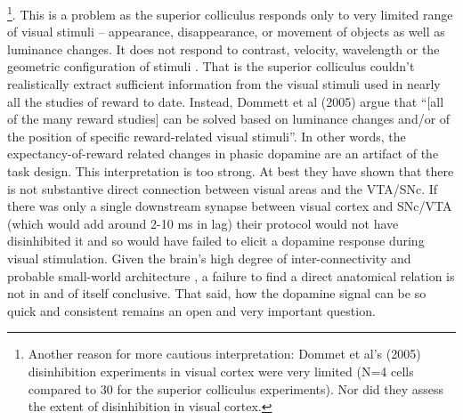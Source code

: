 \documentclass[doc,12pt]{apa}        %
\begin{document}
\footnote{
    Another reason for more cautious interpretation: Dommet et al's (2005) disinhibition experiments in visual cortex were very limited (N=4 cells compared to 30 for the superior colliculus experiments).  Nor did they assess the extent of disinhibition in visual cortex.
}. This is a problem as the superior colliculus responds only to very limited range of visual stimuli -- appearance, disappearance, or movement of objects as well as luminance changes.  It does not respond to contrast, velocity, wavelength or the geometric configuration of stimuli \cite{Dommett:2005p7263}. That is the superior colliculus couldn't realistically extract sufficient information from the visual stimuli used in nearly all the studies of reward to date.  Instead, Dommett et al (2005) argue that ``[all of the many reward studies] can be solved based on luminance changes and/or of the position of specific reward-related visual stimuli''.  In other words, the expectancy-of-reward related changes in phasic dopamine are an artifact of the task design.  This interpretation is too strong.  At best they have shown that there is not substantive direct connection between visual areas and the VTA/SNc.  If there was only a single downstream synapse between visual cortex and SNc/VTA (which would add around 2-10 ms in lag) their protocol would not have disinhibited it and so would have failed to elicit a dopamine response during visual stimulation.   Given the brain's high degree of inter-connectivity and probable small-world architecture \cite{bassett:2006aa}, a failure to find a direct anatomical relation is not in and of itself conclusive.  That said, how the dopamine signal can be so quick and consistent remains an open and very important question.
\end{document}
